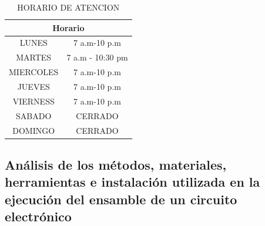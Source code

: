     \begin{table}[h]
        \centering
        \caption{HORARIO DE ATENCION}
        \begin{tabular}{|c |c |}
        \hline
        \multicolumn{2}{c}{Horario}\\
        \hline
             LUNES& 7 a.m-10 p.m  \\
        \hline
             MARTES& 7 a.m - 10:30 pm\\
        \hline
             MIERCOLES& 7 a.m-10 p.m \\  
        \hline
             JUEVES& 7 a.m-10 p.m\\
        \hline
             VIERNESS& 7 a.m-10 p.m\\
        \hline
             SABADO& CERRADO\\
        \hline
             DOMINGO& CERRADO\\
        \hline     
        \end{tabular}
        \label{tab:riego}
    \end{table}
    \subsection{Análisis de los métodos, materiales, herramientas e instalación utilizada en la ejecución del ensamble de un circuito electrónico}
    
